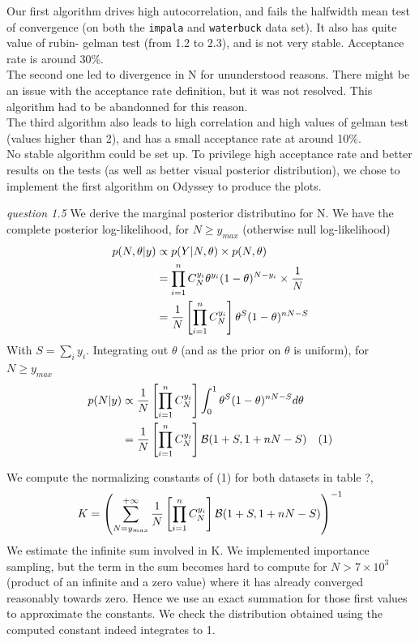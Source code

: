 \documentclass[twoside]{article}
\begin{document}
Our first algorithm drives high autocorrelation, and fails the halfwidth mean test of convergence (on both the \texttt{impala} and \texttt{waterbuck} data set). It also has quite value of rubin-
gelman test (from 1.2 to 2.3), and is not very stable. Acceptance rate is around 30\%.\\

The second one led to divergence in N for ununderstood reasons. There might be an issue with the acceptance rate definition, but it was not resolved. This algorithm had to be abandonned for this reason.\\

The third algorithm also leads to high correlation and high values of gelman test (values higher than 2), and has a small acceptance rate at around 10\%.\\

No stable algorithm could be set up. To privilege high acceptance rate and better results on the tests (as well as better visual posterior distribution), we chose to implement the first algorithm on Odyssey to produce the plots.


\vspace{.2 in}
\textit{question 1.5} We derive the marginal posterior distributino for N. We have the complete posterior log-likelihood,  for $N \geqslant y_{max}$ (otherwise null log-likelihood)
\begin{align*}
p(N, \theta | y) & \propto p(Y | N, \theta) \times p(N, \theta)\\
& = \prod_{i = 1}^{n} C_{N}^{y_i} \* \theta^{y_i} \* (1 - \theta)^{N - y_i} \times \frac{1}{N}\\
& = \frac{1}{N} \* \left[ \prod_{i = 1}^{n} C_{N}^{y_i} \right] \* \theta^{S} \* (1 - \theta)^{n \* N - S}\\
\end{align*}
With $ S = \sum_i y_i$. Integrating out $\theta$ (and as the prior on $\theta$ is uniform), for $N \geqslant y_{max}$
\begin{align*}
p(N | y) & \propto \frac{1}{N} \* \left[ \prod_{i = 1}^{n} C_{N}^{y_i} \right] \* \int_0^1 \theta^{S} \* (1 - \theta)^{n \* N - S} d\theta \\
& = \frac{1}{N} \* \left[ \prod_{i = 1}^{n} C_{N}^{y_i} \right] \* \mathcal{B} (1 + S, 1 + n \* N - S) \quad (1)\\
\end{align*}

We compute the normalizing constants of (1) for both datasets in table ?,
\begin{align*}
K = \left( \sum_{N = y_{max}}^{+ \infty} \frac{1}{N} \* \left[ \prod_{i = 1}^{n} C_{N}^{y_i} \right] \* \mathcal{B} (1 + S, 1 + n \* N - S) \right)^{-1}
\end{align*}
We estimate the infinite sum involved in K. We implemented importance sampling, but the term in the sum becomes hard to compute for $N > 7 \times 10^3$ (product of an infinite and a zero value) where it has already converged reasonably towards zero. Hence we use an exact summation for those first values to approximate the constants. We check the distribution obtained using the computed constant indeed integrates to 1.
\end{document}
